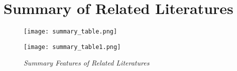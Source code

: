 
\section{Summary of Related Literatures}

\begin{figure}[ht]
    \centering
    \texttt{[image: summary\_table.png]} %
\end{figure}
\begin{figure}[ht]
    \centering
    \texttt{[image: summary\_table1.png]} %
    \caption{\textit{Summary Features of Related Literatures}}
    \label{fig:related-literature}
\end{figure}








